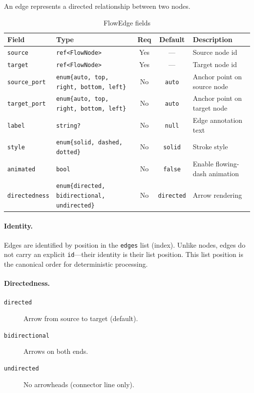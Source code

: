 An edge represents a directed relationship between two nodes.

\begin{table}[h]
\centering
\small
\begin{tabular}{llccp{4.2cm}}
\toprule
\textbf{Field} & \textbf{Type} & \textbf{Req} & \textbf{Default} & \textbf{Description} \\
\midrule
\texttt{source} & \texttt{ref<FlowNode>} & Yes & --- & Source node id \\
\texttt{target} & \texttt{ref<FlowNode>} & Yes & --- & Target node id \\
\texttt{source\_port} & \texttt{enum\{auto, top, right, bottom, left\}} & No & \texttt{auto} & Anchor point on source node \\
\texttt{target\_port} & \texttt{enum\{auto, top, right, bottom, left\}} & No & \texttt{auto} & Anchor point on target node \\
\texttt{label} & \texttt{string?} & No & \texttt{null} & Edge annotation text \\
\texttt{style} & \texttt{enum\{solid, dashed, dotted\}} & No & \texttt{solid} & Stroke style \\
\texttt{animated} & \texttt{bool} & No & \texttt{false} & Enable flowing-dash animation \\
\texttt{directedness} & \texttt{enum\{directed, bidirectional, undirected\}} & No & \texttt{directed} & Arrow rendering \\
\bottomrule
\end{tabular}
\caption{FlowEdge fields}
\label{tab:flow-edge-fields}
\end{table}

\paragraph{Identity.}
Edges are identified by position in the \texttt{edges} list (index). Unlike nodes, edges do not carry an explicit \texttt{id}---their identity is their list position. This list position is the canonical order for deterministic processing.

\paragraph{Directedness.}
\begin{description}
  \item[\texttt{directed}] Arrow from source to target (default).
  \item[\texttt{bidirectional}] Arrows on both ends.
  \item[\texttt{undirected}] No arrowheads (connector line only).
\end{description}

